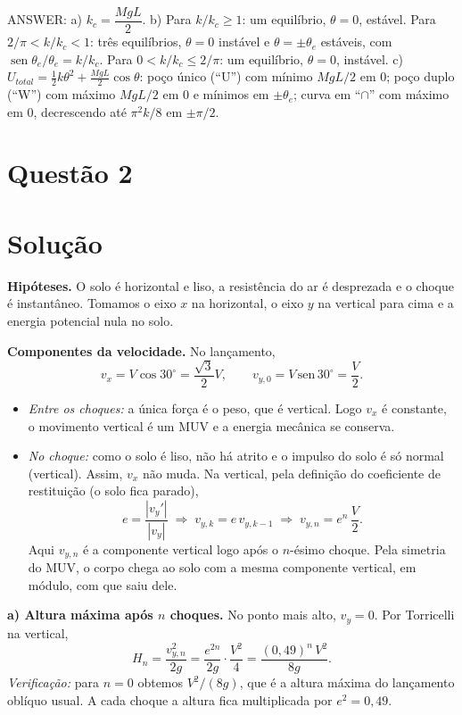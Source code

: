 \documentclass{article}%
\begin{document}
ANSWER: a) $k_c=\dfrac{MgL}{2}$. b) Para $k/k_c\ge1$: um equilíbrio, $\theta=0$, estável. Para $2/\pi<k/k_c<1$: três equilíbrios, $\theta=0$ instável e $\theta=\pm\theta_e$ estáveis, com $\operatorname{sen}\theta_e/\theta_e=k/k_c$. Para $0<k/k_c\le2/\pi$: um equilíbrio, $\theta=0$, instável. c) $U_{total}=\tfrac12k\theta^2+\tfrac{MgL}{2}\cos\theta$: poço único (``U'') com mínimo $MgL/2$ em $0$; poço duplo (``W'') com máximo $MgL/2$ em $0$ e mínimos em $\pm\theta_e$; curva em ``$\cap$'' com máximo em $0$, decrescendo até $\pi^2k/8$ em $\pm\pi/2$.
%
\newpage%
\section*{Questão 2}

\section*{Solução}

\textbf{Hipóteses.} O solo é horizontal e liso, a resistência do ar é desprezada e o choque é instantâneo. Tomamos o eixo $x$ na horizontal, o eixo $y$ na vertical para cima e a energia potencial nula no solo.

\textbf{Componentes da velocidade.} No lançamento,
\[
v_x = V\cos 30^\circ = \frac{\sqrt{3}}{2}V, \qquad v_{y,0} = V\,\mathrm{sen}\, 30^\circ = \frac{V}{2}.
\]
\begin{itemize}
\item \emph{Entre os choques:} a única força é o peso, que é vertical. Logo $v_x$ é constante, o movimento vertical é um MUV e a energia mecânica se conserva.
\item \emph{No choque:} como o solo é liso, não há atrito e o impulso do solo é só normal (vertical). Assim, $v_x$ não muda. Na vertical, pela definição do coeficiente de restituição (o solo fica parado),
\[
e=\frac{|v_y'|}{|v_y|}\;\Rightarrow\; v_{y,k}=e\,v_{y,k-1}\;\Rightarrow\; v_{y,n}=e^{n}\,\frac{V}{2}.
\]
Aqui $v_{y,n}$ é a componente vertical logo após o $n$-ésimo choque. Pela simetria do MUV, o corpo chega ao solo com a mesma componente vertical, em módulo, com que saiu dele.
\end{itemize}

\textbf{a) Altura máxima após $n$ choques.} No ponto mais alto, $v_y=0$. Por Torricelli na vertical,
\[
H_n=\frac{v_{y,n}^2}{2g}=\frac{e^{2n}}{2g}\cdot\frac{V^2}{4}=\frac{(0{,}49)^n\,V^2}{8g}.
\]
\emph{Verificação:} para $n=0$ obtemos $V^2/(8g)$, que é a altura máxima do lançamento oblíquo usual. A cada choque a altura fica multiplicada por $e^2=0{,}49$.
\end{document}
